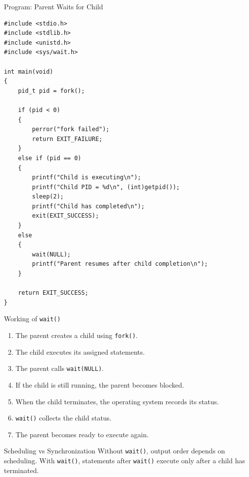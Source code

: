 \documentclass[aspectratio=169]{beamer}
\begin{document}
\begin{frame}[fragile]{Program: Parent Waits for Child}

\begin{lstlisting}[style=cstyle]
#include <stdio.h>
#include <stdlib.h>
#include <unistd.h>
#include <sys/wait.h>

int main(void)
{
    pid_t pid = fork();

    if (pid < 0)
    {
        perror("fork failed");
        return EXIT_FAILURE;
    }
    else if (pid == 0)
    {
        printf("Child is executing\n");
        printf("Child PID = %d\n", (int)getpid());
        sleep(2);
        printf("Child has completed\n");
        exit(EXIT_SUCCESS);
    }
    else
    {
        wait(NULL);
        printf("Parent resumes after child completion\n");
    }

    return EXIT_SUCCESS;
}
\end{lstlisting}

\end{frame}

\begin{frame}{Working of \texttt{wait()}}

\begin{enumerate}
    \item The parent creates a child using \texttt{fork()}.
    \item The child executes its assigned statements.
    \item The parent calls \texttt{wait(NULL)}.
    \item If the child is still running, the parent becomes blocked.
    \item When the child terminates, the operating system records its status.
    \item \texttt{wait()} collects the child status.
    \item The parent becomes ready to execute again.
\end{enumerate}

\begin{alertblock}{Scheduling vs Synchronization}
Without \texttt{wait()}, output order depends on scheduling. With
\texttt{wait()}, statements after \texttt{wait()} execute only after a child has
terminated.
\end{alertblock}

\end{frame}
\end{document}
